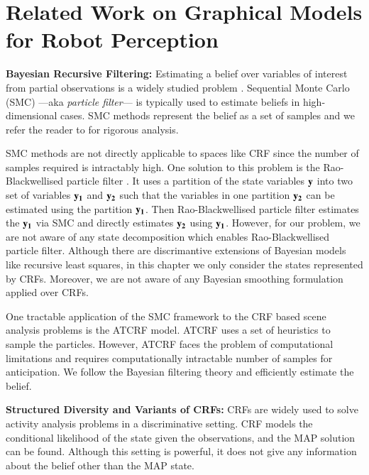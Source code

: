 \section{Related Work on Graphical Models for Robot Perception}
\label{relwork}
\noindent
{\bf Bayesian Recursive Filtering:}
\label{parf}
Estimating a belief over variables of interest from partial observations is a widely studied problem \cite{thrunBook}. Sequential Monte Carlo (SMC) ---aka \emph{particle filter}--- is typically used to estimate beliefs in high-dimensional cases. SMC methods represent the belief as a set of samples and we refer the reader to \cite{meanFieldBook} for rigorous analysis.

SMC methods are not directly applicable to spaces like CRF since the number of samples required is intractably high. One solution to this problem is the Rao-Blackwellised particle filter \cite{raob}. It uses a partition of the state variables $\bf{y}$ into two set of variables $\bf{y}_1$ and $\bf{y}_2$ such that the variables in one partition $\bf{y}_2$ can be estimated using the partition $\bf{y}_1$. Then Rao-Blackwellised particle filter \cite{raob} estimates the $\bf{y}_1$ via SMC and directly estimates $\bf{y}_2$ using $\bf{y}_1$. However, for our problem, we are not aware of any state decomposition which enables Rao-Blackwellised particle filter. Although there are discrimantive extensions of Bayesian models like recursive least squares\cite{sarkka}, in this chapter we only consider the states represented by CRFs. Moreover, we are not aware of any Bayesian smoothing formulation applied over CRFs.

One tractable application of the SMC framework to the CRF based scene analysis problems is the ATCRF \cite{hemaAnt} model. ATCRF \cite{hemaAnt} uses a set of heuristics to sample the particles. However, ATCRF faces the problem of computational limitations and requires computationally intractable number of samples for anticipation. We follow the Bayesian filtering theory and efficiently estimate the belief.

\noindent
{\bf Structured Diversity and Variants of CRFs:}
CRFs are widely used to solve activity analysis problems \cite{siminchi2005,quattoni2007} in a discriminative setting. CRF models the conditional likelihood of the state given the observations, and the MAP solution can be found. Although this setting is powerful, it does not give any information about the belief other than the MAP state.

